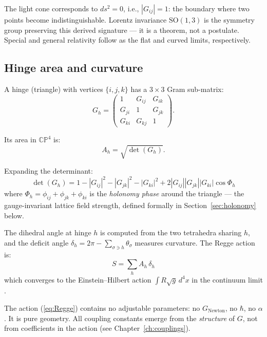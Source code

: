 \begin{remark}
The light cone corresponds to $ds^2 = 0$, i.e., $|G_{ij}| = 1$: the boundary where two points become indistinguishable. Lorentz invariance $\text{SO}(1,3)$ is the symmetry group preserving this derived signature --- it is a theorem, not a postulate. Special and general relativity follow as the flat and curved limits, respectively.
\end{remark}

\subsection{Hinge area and curvature}

A hinge (triangle) with vertices $\{i, j, k\}$ has a $3\times 3$ Gram sub-matrix:
\begin{equation}
G_h = \begin{pmatrix} 1 & G_{ij} & G_{ik} \\ G_{ji} & 1 & G_{jk} \\ G_{ki} & G_{kj} & 1 \end{pmatrix}.
\end{equation}

Its area in $\mathbb{CP}^4$ is:
\begin{equation}
A_h = \sqrt{\det(G_h)}.
\end{equation}

Expanding the determinant:
\begin{equation}
\det(G_h) = 1 - |G_{ij}|^2 - |G_{jk}|^2 - |G_{ki}|^2 + 2|G_{ij}||G_{jk}||G_{ki}|\cos\Phi_h
\label{eq:detGh}
\end{equation}
where $\Phi_h = \phi_{ij} + \phi_{jk} + \phi_{ki}$ is the \emph{holonomy phase} around the triangle --- the gauge-invariant lattice field strength, defined formally in Section~\ref{sec:holonomy} below.

The dihedral angle at hinge $h$ is computed from the two tetrahedra sharing $h$, and the deficit angle $\delta_h = 2\pi - \sum_{\sigma \ni h} \theta_\sigma$ measures curvature. The Regge action is:
\begin{equation}
\boxed{S = \sum_h A_h\,\delta_h}
\label{eq:Regge}
\end{equation}
which converges to the Einstein--Hilbert action $\int R\sqrt{g}\,d^4x$ in the continuum limit \cite{Regge}.

\begin{remark}
The action (\ref{eq:Regge}) contains no adjustable parameters: no $G_\text{Newton}$, no $\hbar$, no $\alpha$. It is pure geometry. All coupling constants emerge from the \emph{structure} of $G$, not from coefficients in the action (see Chapter~\ref{ch:couplings}).
\end{remark}

